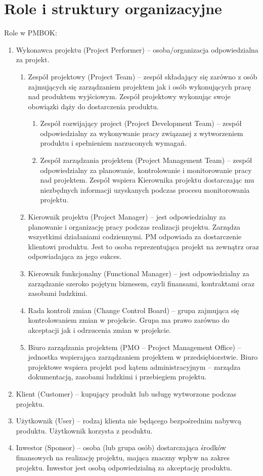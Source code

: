 \section{Role i struktury organizacyjne}

Role w PMBOK:
\begin{enumerate}
\item	Wykonawca projektu (Project Performer) – osoba/organizacja odpowiedzialna za projekt.
	\begin{enumerate}
	\item	Zespół projektowy (Project Team) – zespół składający się zarówno z osób zajmujących się zarządzaniem projektem jak i  osób wykonujących pracę nad produktem wyjściowym.  Zespół projektowy wykonując swoje obowiązki dąży do dostarczenia produktu.
		\begin{enumerate}
		\item	Zespół rozwijający project (Project Development Team) – zespół odpowiedzialny za wykonywanie pracy związanej z wytworzeniem produktu i spełnieniem narzuconych wymagań.
		\item	Zespół zarządzania projektem (Project Management Team) – zespół odpowiedzialny za planowanie, kontrolowanie i monitorowanie pracy nad projektem. Zespół wspiera Kierownika projektu dostarczając mu niezbędnych informacji uzyskanych podczas procesu monitorowania projektu.
		\end{enumerate}
	\item	Kierownik projektu (Project Manager) – jest odpowiedzialny za planowanie i organizację pracy podczas realizacji projektu. Zarządza wszystkimi działaniami codziennymi. PM odpowiada za dostarczenie klientowi produktu. Jest to osoba reprezentująca projekt na zewnątrz oraz odpowiadająca za jego sukces.
	\item	Kierownik funkcjonalny (Functional Manager) – jest odpowiedzialny za zarządzanie szeroko pojętym biznesem, czyli finansami, kontraktami oraz zasobami ludzkimi.
	\item	Rada kontroli zmian (Change Control Board) – grupa zajmująca się kontrolowaniem zmian w projekcie. Grupa ma prawo zarówno do akceptacji jak i odrzucenia zmian w projekcie. 
	\item	Biuro zarządzania projektem (PMO – Project Management Office) – jednostka wspierająca zarządzaniem projektem w przedsiębiorstwie. Biuro projektowe wspiera projekt pod kątem administracyjnym – zarządza dokumentacją, zasobami ludzkimi i przebiegiem projektu.
	\end{enumerate}
\item	Klient (Customer) – kupujący produkt lub usługę wytworzone podczas projektu.  
\item	Użytkownik (User) – rodzaj klienta nie będącego bezpośrednim nabywcą produktu. Użytkownik korzysta  z produktu.
\item	Inwestor (Sponsor) – osoba (lub grupa osób) dostarczająca środków finansowych na realizację projektu, mająca znaczny wpływ na zakres projektu. Inwestor jest osobą odpowiedzialną za akceptację produktu.


\end{enumerate}
